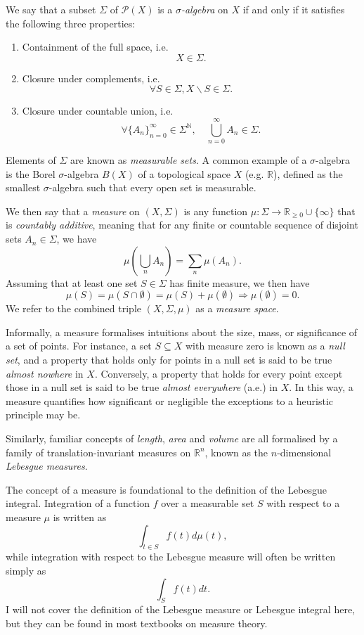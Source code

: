 \documentclass[honours,12pt]{unswthesis}
\def\implies{\Rightarrow}
\numberwithin{equation}{section}
\begin{document}
We say that a subset $\Sigma$ of $\mathcal{P}(X)$ is a  \textit{$\sigma$-algebra} on $X$ if and only if it satisfies the following three properties:
\begin{enumerate}
	\item Containment of the full space, i.e. $$X\in\Sigma.$$
	\item Closure under complements, i.e. $$\forall S \in \Sigma, X\backslash S\in\Sigma.$$
	\item Closure under countable union, i.e. $$\forall \{A_n\}_{n=0}^\infty\in\Sigma^{\mathbb{N}},\quad\bigcup_{n=0}^\infty A_n \in \Sigma.$$
\end{enumerate}
Elements of $\Sigma$ are known as \textit{measurable sets}. A common example of a $\sigma$-algebra is the Borel $\sigma$-algebra $B(X)$ of a topological space $X$ (e.g. $\mathbb{R}$), defined as the smallest $\sigma$-algebra such that every open set is measurable.

We then say that a \textit{measure} on $(X,\Sigma)$ is any function $\mu:\Sigma\to\mathbb{R}_{\geq 0}\cup\{\infty\}$ that is \textit{countably additive}, meaning that for any finite or countable sequence of disjoint sets $A_n\in\Sigma$, we have
$$\mu\left(\bigcup_n A_n\right) = \sum_n \mu(A_n).$$
Assuming that at least one set $S\in\Sigma$ has finite measure, we then have $$\mu(S)=\mu(S\cap\emptyset)=\mu(S)+\mu(\emptyset) \implies \mu(\emptyset)=0.$$
We refer to the combined triple $(X,\Sigma,\mu)$ as a \textit{measure space}.

Informally, a measure formalises intuitions about the size, mass, or significance of a set of points. For instance, a set $S\subseteq X$ with measure zero is known as a \textit{null set}, and a property that holds only for points in a null set is said to be true \textit{almost nowhere} in $X$. Conversely, a property that holds for every point except those in a null set is said to be true \textit{almost everywhere} (a.e.) in $X$. In this way, a measure quantifies how significant or negligible the exceptions to a heuristic principle may be.

Similarly, familiar concepts of \textit{length}, \textit{area} and \textit{volume} are all formalised by a family of translation-invariant measures on $\mathbb{R}^n$, known as the $n$-dimensional \textit{Lebesgue measures}.

The concept of a measure is foundational to the definition of the Lebesgue integral. Integration of a function $f$ over a measurable set $S$ with respect to a measure $\mu$ is written as
$$\int_{t\in S} f(t) d\mu(t),$$
while integration with respect to the Lebesgue measure will often be written simply as
$$\int_S f(t)dt.$$
I will not cover the definition of the Lebesgue measure or Lebesgue integral here, but they can be found in most textbooks on measure theory.
\end{document}
